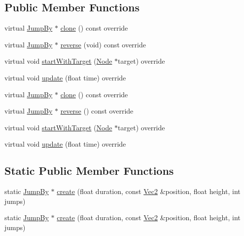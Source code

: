 \subsection*{Public Member Functions}
\begin{DoxyCompactItemize}
\item 
virtual \hyperlink{classJumpBy}{Jump\+By} $\ast$ \hyperlink{classJumpBy_aea740cb701f25c7648c8eb24f71f6ba3}{clone} () const override
\item 
virtual \hyperlink{classJumpBy}{Jump\+By} $\ast$ \hyperlink{classJumpBy_a009830002b7a51e9e630baa0b227d279}{reverse} (void) const override
\item 
virtual void \hyperlink{classJumpBy_a3b05635b8834c6269b249dc1247854e9}{start\+With\+Target} (\hyperlink{classNode}{Node} $\ast$target) override
\item 
virtual void \hyperlink{classJumpBy_a9c3f6254cee8c998018b3ffb94c3cede}{update} (float time) override
\item 
virtual \hyperlink{classJumpBy}{Jump\+By} $\ast$ \hyperlink{classJumpBy_a2947fd7c75a21d9ee629bc7bffdad2fa}{clone} () const override
\item 
virtual \hyperlink{classJumpBy}{Jump\+By} $\ast$ \hyperlink{classJumpBy_ae177fcfe7008837b15fca646645d9396}{reverse} () const override
\item 
virtual void \hyperlink{classJumpBy_a1b06529f442819574e111837caf2c329}{start\+With\+Target} (\hyperlink{classNode}{Node} $\ast$target) override
\item 
virtual void \hyperlink{classJumpBy_ab5db757bd7bd2586677c688c1add497b}{update} (float time) override
\end{DoxyCompactItemize}
\subsection*{Static Public Member Functions}
\begin{DoxyCompactItemize}
\item 
static \hyperlink{classJumpBy}{Jump\+By} $\ast$ \hyperlink{classJumpBy_a9ae8d612da2881d4446a79910affb071}{create} (float duration, const \hyperlink{classVec2}{Vec2} \&position, float height, int jumps)
\item 
static \hyperlink{classJumpBy}{Jump\+By} $\ast$ \hyperlink{classJumpBy_a7510318f2d02cb8c16d1cd312fd807e5}{create} (float duration, const \hyperlink{classVec2}{Vec2} \&position, float height, int jumps)
\end{DoxyCompactItemize}
